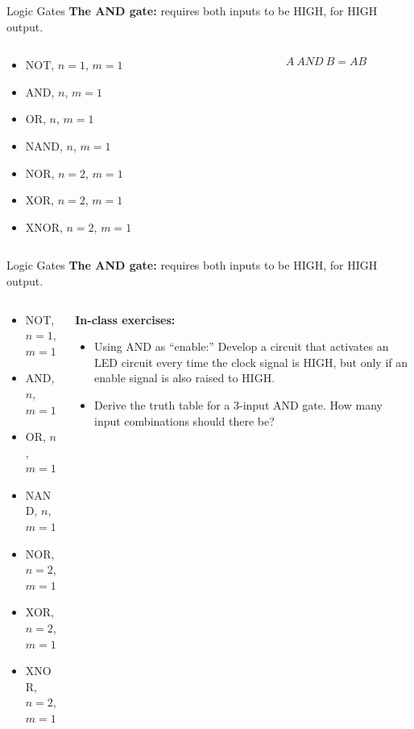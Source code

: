 \documentclass{beamer}
\begin{document}
\begin{frame}{Logic Gates}
\textbf{The AND gate:} requires both inputs to be HIGH, for HIGH output. \\ \vspace{0.5cm}
\begin{columns}[T]
\begin{column}{0.5\textwidth}
\begin{itemize}
\item \alert{NOT, $n=1$, $m=1$}
\item \alert{AND, $n$, $m=1$}
\item OR, $n$, $m=1$
\item NAND, $n$, $m=1$
\item NOR, $n=2$, $m=1$
\item XOR, $n=2$, $m=1$
\item XNOR, $n=2$, $m=1$
\end{itemize}
\end{column}
\begin{column}{0.5\textwidth}
\begin{equation}
A ~ AND ~ B = AB
\end{equation}
\end{column}
\end{columns}
\end{frame}

\begin{frame}{Logic Gates}
\textbf{The AND gate:} requires both inputs to be HIGH, for HIGH output. \\ \vspace{0.5cm}
\begin{columns}[T]
\begin{column}{0.5\textwidth}
\begin{itemize}
\item \alert{NOT, $n=1$, $m=1$}
\item \alert{AND, $n$, $m=1$}
\item OR, $n$, $m=1$
\item NAND, $n$, $m=1$
\item NOR, $n=2$, $m=1$
\item XOR, $n=2$, $m=1$
\item XNOR, $n=2$, $m=1$
\end{itemize}
\end{column}
\begin{column}{0.5\textwidth}
\small 
\textbf{In-class exercises:}
\begin{itemize}
\item Using AND as ``enable:'' Develop a circuit that activates an LED circuit every time the clock signal is HIGH, but only if an enable signal is also raised to HIGH.
\item Derive the truth table for a 3-input AND gate.  How many input combinations should there be?
\end{itemize}
\end{column}
\end{columns}
\end{frame}
\end{document}

